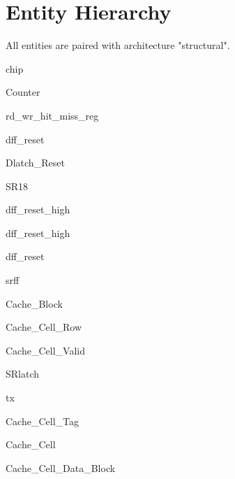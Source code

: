 \documentclass[10pt]{article}
\begin{document}
\section{Entity Hierarchy}
    All entities are paired with architecture "structural".
    \begin{longenum}
    \item chip
        \begin{longenum}
        \item Counter
            \begin{longenum}
            \item rd_wr_hit_miss_reg
                \begin{longenum}
                \item dff_reset
                \item{Dlatch_Reset}
                \end{longenum}
            \item SR18
                \begin{longenum}
                \item dff_reset_high
                \end{longenum}
            \item dff_reset_high
            \item dff_reset
            \item srff
            \end{longenum}
        \item Cache_Block
            \begin{longenum}
            \item Cache_Cell_Row
                \begin{longenum}
                \item Cache_Cell_Valid
                    \begin{longenum}
                    \item SRlatch
                    \item tx
                    \end{longenum}
                \item Cache_Cell_Tag
                    \begin{longenum}    
                    \item Cache_Cell
                    \end{longenum}
                \item Cache_Cell_Data_Block
                    \begin{longenum}

\end{longenum}
\end{longenum}
\end{longenum}
\end{longenum}
\end{longenum}
\end{document}
